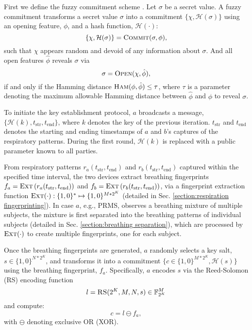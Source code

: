 First we define the fuzzy commitment scheme \cite{JuelsFuzzyCommitmentScheme1999}. Let $\sigma$ be a secret value. A fuzzy commitment transforms a secret value $\sigma$ into a commitment $\{\chi, \mathcal{H}(\sigma)\}$ using an opening feature, $\phi$, and a hash function, $\mathcal{H}(\cdot)$:
\[
\{\chi, \mathcal{H}(\sigma)\} = \textsc{Commit}(\sigma, \phi),
\]
such that $\chi$ appears random and devoid of any information about $\sigma$. And all open features $\hat{\phi}$ reveals $\sigma$ via 
\[
\sigma=\textsc{Open}(\chi,\hat{\phi}),
\]
if and only if the Hamming distance $\textsc{Ham}(\phi, \hat{\phi}) \leq \tau$, where $\tau$ is a parameter denoting the maximum allowable Hamming distance between $\hat{\phi}$ and $\phi$ to reveal $\sigma$. 

To initiate the key establishment protocol, $a$ broadcasts a message, $\{ \mathcal{H}(k), t_{\text{str}}, t_{\text{end}} \}$, where $k$ denotes the key of the previous iteration. $t_{\text{str}}$ and $t_{\text{end}}$ denotes the starting and ending timestamps of $a$ and $b$'s captures of the respiratory patterns. During the first round,  $\mathcal{H}(k)$ is replaced with a public parameter known to all parties.

From respiratory patterns $r_{a}(t_{\text{str}}, t_{\text{end}})$ and $r_{b}(t_{\text{str}}, t_{\text{end}})$ captured within the specified time interval, the two devices extract breathing fingerprints $f_{a} = \textsc{Ext} \left( r_{a}(t_{\text{str}}, t_{\text{end}}) \right)$ and $f_{b} = \textsc{Ext} \left( r_{b}(t_{\text{str}}, t_{\text{end}}) \right)$, via a fingerprint extraction function $\textsc{Ext} (\cdot): \{1,0\}^{*} \mapsto \{1,0\}^{M*2^K}$ (detailed in Sec. \ref{section:respiration fingerprinting}). In case $a$, e.g., PRMS, observes a breathing mixture of multiple subjects, the mixture is first separated into the breathing patterns of individual subjects (detailed in Sec. \ref{section:breathing separation}), which are processed by $\textsc{Ext} (\cdot)$ to create multiple fingerprints, one for each subject.

Once the breathing fingerprints are generated, $a$ randomly selects a key salt, $ s \in \{1,0\}^{N*2^K}$, and transforms it into a commitment $\{c \in \{1,0\}^{M*2^K}, \mathcal{H}(s)\}$ using the breathing fingerprint, $f_{a}$. Specifically, $a$ encodes $s$ via the Reed-Solomon (RS) encoding function
\[
l = \textsc{RS}(2^K, M, N, s) \in \mathbb{F}^M_{2^K}
\]
and compute:
\[
c = l \ominus f_{a},
\]
with $\ominus$ denoting exclusive OR (XOR).


